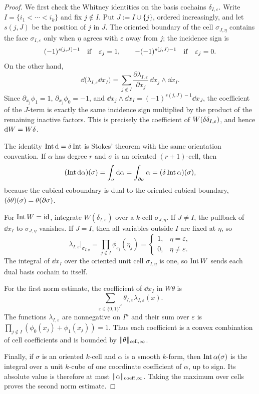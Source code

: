 \begin{proof}
We first check the Whitney identities on the basis cochains
$\delta_{I,\varepsilon}$. Write
$I=\{i_1<\cdots<i_k\}$ and fix $j\notin I$. Put $J:=I\cup\{j\}$, ordered
increasingly, and let $s(j,J)$ be the position of $j$ in $J$. The oriented
boundary of the cell $\sigma_{J,\eta}$ contains the face
$\sigma_{I,\varepsilon}$ only when $\eta$ agrees with $\varepsilon$ away from
$j$; the incidence sign is
\[
(-1)^{s(j,J)-1}\quad{\rm if}\quad \varepsilon_j=1,
\qquad
-(-1)^{s(j,J)-1}\quad{\rm if}\quad \varepsilon_j=0.
\]
On the other hand,
\[
\dd\bigl(\lambda_{I,\varepsilon}\dd x_I\bigr)
=
\sum_{j\notin I}
\frac{\partial\lambda_{I,\varepsilon}}{\partial x_j}\,
\dd x_j\wedge\dd x_I .
\]
Since
$\partial_{x_j}\phi_1=1$, $\partial_{x_j}\phi_0=-1$, and
$\dd x_j\wedge\dd x_I=(-1)^{s(j,J)-1}\dd x_J$, the coefficient of the
$J$-term is exactly the same incidence sign multiplied by the product of the
remaining inactive factors. This is precisely the coefficient of
$W(\delta\delta_{I,\varepsilon})$, and hence $\mathrm{d} W=W\delta$.

The identity $\operatorname{Int}\mathrm{d}=\delta\operatorname{Int}$ is Stokes' theorem with the same
orientation convention. If $\alpha$ has degree $r$ and $\sigma$ is an oriented $(r+1)$-cell, then
\[
(\operatorname{Int}\mathrm{d}\alpha)(\sigma)
=
\int_\sigma\mathrm{d}\alpha
=
\int_{\partial\sigma}\alpha
=
(\delta\operatorname{Int}\alpha)(\sigma),
\]
because the cubical coboundary is dual to the oriented cubical boundary,
$(\delta\theta)(\sigma)=\theta(\partial\sigma)$.

For $\operatorname{Int} W=\mathrm{id}$, integrate $W(\delta_{I,\varepsilon})$ over a
$k$-cell $\sigma_{J,\eta}$. If $J\ne I$, the pullback of $\dd x_I$ to
$\sigma_{J,\eta}$ vanishes. If $J=I$, then all variables outside $I$ are fixed
at $\eta$, so
\[
\lambda_{I,\varepsilon}\big|_{\sigma_{I,\eta}}
=
\prod_{j\notin I}\phi_{\varepsilon_j}(\eta_j)
=
\begin{cases}
1,&\eta=\varepsilon,\\
0,&\eta\ne\varepsilon.
\end{cases}
\]
The integral of $\dd x_I$ over the oriented unit cell $\sigma_{I,\eta}$ is
one, so $\operatorname{Int} W$ sends each dual basis cochain to itself.

For the first norm estimate, the coefficient of $\dd x_I$ in $W\theta$ is
\[
\sum_{\varepsilon\in\{0,1\}^{I^c}}
\theta_{I,\varepsilon}\lambda_{I,\varepsilon}(x).
\]
The functions $\lambda_{I,\varepsilon}$ are nonnegative on $I^n$ and their sum
over $\varepsilon$ is
$\prod_{j\notin I}(\phi_0(x_j)+\phi_1(x_j))=1$. Thus each coefficient is a
convex combination of cell coefficients and is bounded by
$\lVert \theta \rVert_{\mathrm{cell},\infty}$.

Finally, if $\sigma$ is an oriented $k$-cell and $\alpha$ is a smooth $k$-form,
then $\operatorname{Int}\alpha(\sigma)$ is the integral over a unit $k$-cube of one
coordinate coefficient of $\alpha$, up to sign. Its absolute value is therefore
at most $\lVert \alpha \rVert_{\mathrm{coeff},\infty}$. Taking the maximum over cells proves
the second norm estimate.
\end{proof}

